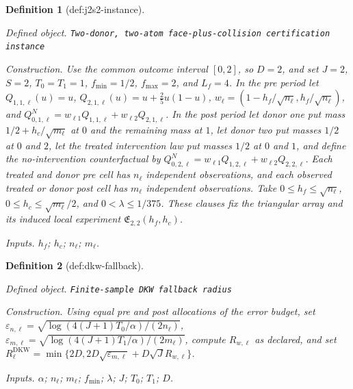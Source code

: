 \documentclass{article}
\newtheorem{definition}{Definition}
\begin{document}
\begin{definition}[def:j2s2-instance]\label{def:j2s2-instance}
\par\smallskip\noindent\emph{Defined object.} \texttt{Two-\allowbreak{}donor,\allowbreak{} two-\allowbreak{}atom face-\allowbreak{}plus-\allowbreak{}collision certification instance}
\par\smallskip\noindent\emph{Construction.} Use the common outcome interval \([0,2]\), so \(D=2\), and set \(J=2\), \(S=2\), \(T_0=T_1=1\), \(f_{\min}=1/2\), \(f_{\max}=2\), and \(L_f=4\). In the pre period let \(Q_{1,1,\ell}(u)=u\), \(Q_{2,1,\ell}(u)=u+\tfrac25u(1-u)\), \(w_\ell=(1-h_f/\sqrt{n_\ell},h_f/\sqrt{n_\ell})\), and \(Q^N_{0,1,\ell}=w_{\ell1}Q_{1,1,\ell}+w_{\ell2}Q_{2,1,\ell}\). In the post period let donor one put mass \(1/2+h_c/\sqrt{m_\ell}\) at \(0\) and the remaining mass at \(1\), let donor two put masses \(1/2\) at \(0\) and \(2\), let the treated intervention law put masses \(1/2\) at \(0\) and \(1\), and define the no-intervention counterfactual by \(Q^N_{0,2,\ell}=w_{\ell1}Q_{1,2,\ell}+w_{\ell2}Q_{2,2,\ell}\). Each treated and donor pre cell has \(n_\ell\) independent observations, and each observed treated or donor post cell has \(m_\ell\) independent observations. Take \(0\leq h_f\leq\sqrt{n_\ell}\), \(0\leq h_c\leq\sqrt{m_\ell}/2\), and \(0<\lambda\leq1/375\). These clauses fix the triangular array and its induced local experiment \(\mathfrak E_{2,2}(h_f,h_c)\).
\par\smallskip\noindent\emph{Inputs.} \(h_f\); \(h_c\); \(n_\ell\); \(m_\ell\).
\end{definition}

\begin{definition}[def:dkw-fallback]\label{def:dkw-fallback}
\par\smallskip\noindent\emph{Defined object.} \texttt{Finite-\allowbreak{}sample DKW fallback radius}
\par\smallskip\noindent\emph{Construction.} Using equal pre and post allocations of the error budget, set \(\varepsilon_{n,\ell}=\sqrt{\log(4(J+1)T_0/\alpha)/(2n_\ell)}\), \(\varepsilon_{m,\ell}=\sqrt{\log(4(J+1)T_1/\alpha)/(2m_\ell)}\), compute \(R_{w,\ell}\) as declared, and set \(R^{\mathrm{DKW}}_\ell=\min\{2D,2D\sqrt{\varepsilon_{m,\ell}}+D\sqrt J R_{w,\ell}\}\).
\par\smallskip\noindent\emph{Inputs.} \(\alpha\); \(n_\ell\); \(m_\ell\); \(f_{\min}\); \(\lambda\); \(J\); \(T_0\); \(T_1\); \(D\).
\end{definition}
\end{document}
